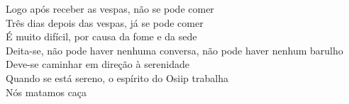 \begin{linenumbers}\begingroup\raggedright
 
\noindent Logo após receber as vespas, não se pode comer\\
 Três dias depois das vespas, já se pode comer\\
 É muito difícil, por causa da fome e da sede\\
 Deita-se, não pode haver nenhuma conversa, não pode haver nenhum barulho\\
 Deve-se caminhar em direção à serenidade\\
 Quando se está sereno, o espírito do Osiip trabalha\\
 Nós matamos caça
 
\end{linenumbers}\endgroup

\bigskip

